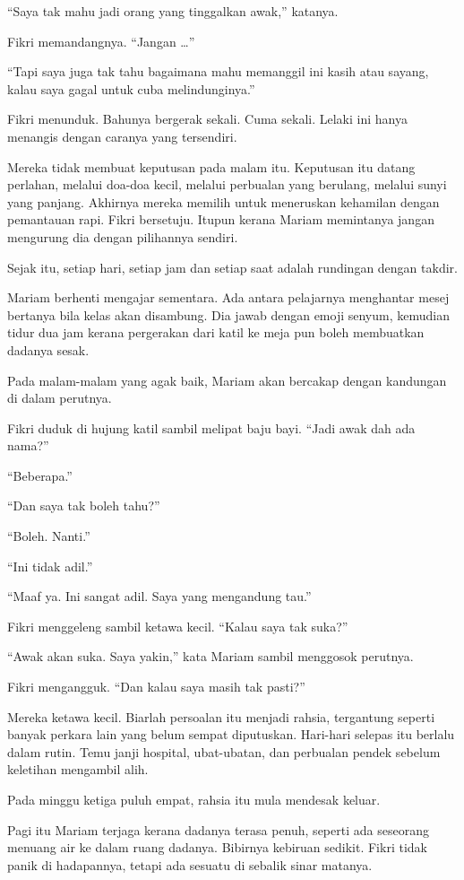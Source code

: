\documentclass[
  11pt,
  a5paper,
  openany,
  oneside]{book}
\begin{document}
``Saya tak mahu jadi orang yang tinggalkan awak,'' katanya.

Fikri memandangnya. ``Jangan \ldots''

``Tapi saya juga tak tahu bagaimana mahu memanggil ini kasih atau
sayang, kalau saya gagal untuk cuba melindunginya.''

Fikri menunduk. Bahunya bergerak sekali. Cuma sekali. Lelaki ini hanya
menangis dengan caranya yang tersendiri.

Mereka tidak membuat keputusan pada malam itu. Keputusan itu datang
perlahan, melalui doa-doa kecil, melalui perbualan yang berulang,
melalui sunyi yang panjang. Akhirnya mereka memilih untuk meneruskan
kehamilan dengan pemantauan rapi. Fikri bersetuju. Itupun kerana Mariam
memintanya jangan mengurung dia dengan pilihannya sendiri.

Sejak itu, setiap hari, setiap jam dan setiap saat adalah rundingan
dengan takdir.

Mariam berhenti mengajar sementara. Ada antara pelajarnya menghantar
mesej bertanya bila kelas akan disambung. Dia jawab dengan emoji senyum,
kemudian tidur dua jam kerana pergerakan dari katil ke meja pun boleh
membuatkan dadanya sesak.

Pada malam-malam yang agak baik, Mariam akan bercakap dengan kandungan
di dalam perutnya.

Fikri duduk di hujung katil sambil melipat baju bayi. ``Jadi awak dah
ada nama?''

``Beberapa.''

``Dan saya tak boleh tahu?''

``Boleh. Nanti.''

``Ini tidak adil.''

``Maaf ya. Ini sangat adil. Saya yang mengandung tau.''

Fikri menggeleng sambil ketawa kecil. ``Kalau saya tak suka?''

``Awak akan suka. Saya yakin,'' kata Mariam sambil menggosok perutnya.

Fikri mengangguk. ``Dan kalau saya masih tak pasti?''

Mereka ketawa kecil. Biarlah persoalan itu menjadi rahsia, tergantung
seperti banyak perkara lain yang belum sempat diputuskan. Hari-hari
selepas itu berlalu dalam rutin. Temu janji hospital, ubat-ubatan, dan
perbualan pendek sebelum keletihan mengambil alih.

Pada minggu ketiga puluh empat, rahsia itu mula mendesak keluar.

Pagi itu Mariam terjaga kerana dadanya terasa penuh, seperti ada
seseorang menuang air ke dalam ruang dadanya. Bibirnya kebiruan sedikit.
Fikri tidak panik di hadapannya, tetapi ada sesuatu di sebalik sinar
matanya.
\end{document}
